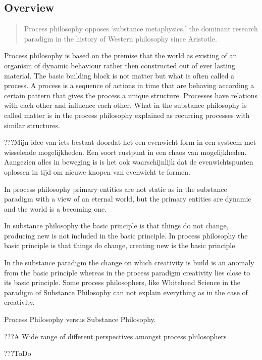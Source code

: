 \documentclass[a4paper]{Thesis}
\begin{document}
\subsection{Overview}


\begin{quotation}
	Process philosophy opposes ‘substance metaphysics,’ the dominant research paradigm in the history of Western philosophy since Aristotle. 
\end{quotation}
\cite{Seibt2013}

Process philosophy is based on the premise that the world as existing of an organism of dynamic behaviour rather then constructed out of ever lasting material. The basic building block is not matter but what is often called a process. A process is a sequence of actions in time that are behaving according a certain pattern that gives the process a unique structure. Processes have relations with each other and influence each other. What in the substance philosophy is called matter is in the process philosophy explained as recurring processes with similar structures.

???Mijn idee van iets bestaat doordat het een evenwicht form in een systeem met wisselende mogelijkheden. Een soort rustpunt in een chaos van mogelijkheden.
Aangezien alles in beweging is is het ook waarschijnlijk dat de evenwichtspunten oplossen in tijd om nieuwe knopen van evenwicht te formen.

In process philosophy primary entities are not static as in the substance paradigm with a view of an eternal world, but the primary entities are dynamic and the world is a becoming one.

In substance philosophy the basic principle is that things do not change, producing new is not included in the basic principle.
In process philosophy the basic principle is that things do change, creating new is the basic principle.

In the substance paradigm the change on which creativity is build is an anomaly from the basic principle whereas in the process paradigm creativity lies close to its basic principle. Some process philosophers, like Whitehead \cite{whitehead1929process} Science in the paradigm of Substance Philosophy can not explain everything as in the case of creativity.

Process Philosophy versus Substance Philosophy.

???A Wide range of different  perspectives amongst process philosophers

???ToDo
\end{document}
